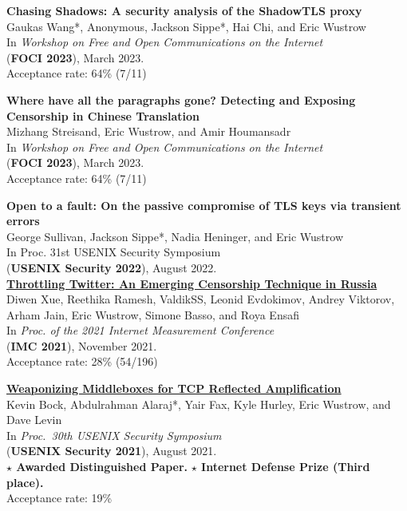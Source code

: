 \documentclass[margin,11pt]{res} %
\begin{document}
    \textbf{Chasing Shadows: A security analysis of the ShadowTLS proxy} \\
    Gaukas Wang*, Anonymous, Jackson Sippe*, Hai Chi, and Eric Wustrow \\
    In \emph{Workshop on Free and Open Communications on the Internet} \\
    (\textbf{FOCI 2023}), March 2023. \\
    Acceptance rate: 64\% (7/11)

    \textbf{Where have all the paragraphs gone? Detecting and Exposing Censorship in Chinese Translation} \\
    Mizhang Streisand, Eric Wustrow, and Amir Houmansadr \\
    In \emph{Workshop on Free and Open Communications on the Internet} \\
    (\textbf{FOCI 2023}), March 2023. \\
    Acceptance rate: 64\% (7/11)

    \textbf{Open to a fault: On the passive compromise of TLS keys via transient errors} \\
    George Sullivan, Jackson Sippe*, Nadia Heninger, and Eric Wustrow \\
    In {Proc. 31st USENIX Security Symposium} \\
    (\textbf{USENIX Security 2022}), August 2022. \\


    \textbf{\href{https://throttletwitter.com/}{Throttling Twitter: An Emerging Censorship Technique in Russia}} \\
    Diwen Xue, Reethika Ramesh, ValdikSS, Leonid Evdokimov, Andrey Viktorov, Arham Jain, Eric Wustrow, Simone Basso, and Roya Ensafi \\
    In \emph{Proc. of the 2021 Internet Measurement Conference} \\
    (\textbf{IMC 2021}), November 2021. \\
    Acceptance rate: 28\% (54/196)

    \textbf{\href{https://geneva.cs.umd.edu/posts/usenix21-weaponizing-censors/}{Weaponizing Middleboxes for TCP Reflected Amplification}} \\
    Kevin Bock, Abdulrahman Alaraj*, Yair Fax, Kyle Hurley, Eric Wustrow, and Dave Levin \\
    In \emph{Proc.\ 30th USENIX Security Symposium} \\
    (\textbf{USENIX Security 2021}), August 2021. \\
    \textbf{$\star$ Awarded Distinguished Paper.} 
    \textbf{$\star$ Internet Defense Prize (Third place).} \\
    Acceptance rate: 19\% %
\end{document}
